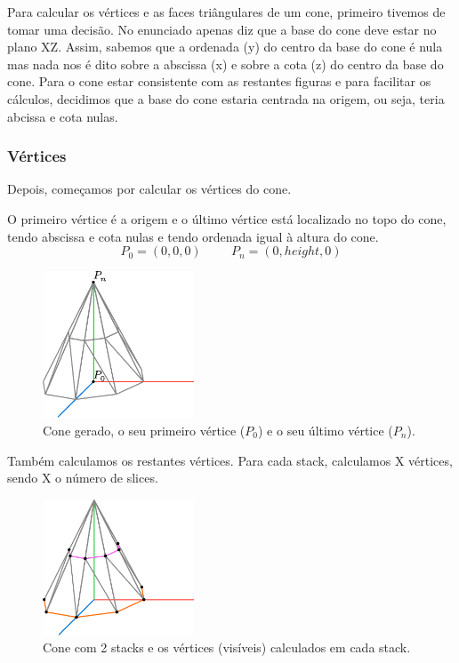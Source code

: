 \documentclass[12pt, a4paper]{article}
\begin{document}
Para calcular os vértices e as faces triângulares de um cone, primeiro tivemos
de tomar uma decisão. No enunciado apenas diz que a base do cone deve estar no
plano XZ. Assim, sabemos que a ordenada (y) do centro da base do cone é nula
mas nada nos é dito sobre a abscissa (x) e sobre a cota (z) do centro da base
do cone. Para o cone estar consistente com as restantes figuras e para facilitar
os cálculos, decidimos que a base do cone estaria centrada na origem, ou seja,
teria abcissa e cota nulas.

\subsubsection{Vértices}

Depois, começamos por calcular os vértices do cone.

O primeiro vértice é a origem e o último vértice está localizado no topo do cone,
tendo abscissa e cota nulas e tendo ordenada igual à altura do cone.
$$
P_0 = (0, 0, 0)
\hspace{1cm}
P_n = (0, height, 0)
$$

\begin{figure}[H]
    \centering
    \includegraphics[width=0.4\textwidth]{res/figures/Cone1.pdf}
    \caption{
        Cone gerado, o seu primeiro vértice ($P_0$) e o seu último vértice ($P_n$).
    }
\end{figure}

Também calculamos os restantes vértices. Para cada stack, calculamos X
vértices, sendo X o número de slices.

\begin{figure}[H]
    \centering
    \includegraphics[width=0.4\textwidth]{res/figures/Cone2.pdf}
    \caption{
        Cone com 2 stacks e os vértices (visíveis) calculados em cada stack.
    }
\end{figure}
\end{document}
